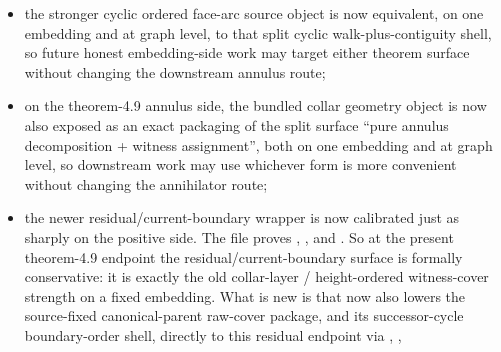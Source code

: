 \documentclass[11pt]{article}
\begin{document}
\begin{itemize}
then upgrades the canonical decomposition
 to a full
annulus witness assignment, and
 packages the honest-source
corollary as
.
So the live one-collar construction burden is now stated on a concrete
facewise object rather than an opaque bundled collar-geometry shell;
\item the stronger cyclic ordered face-arc source object is now equivalent, on
one embedding and at graph level, to that split cyclic walk-plus-contiguity
shell, so future honest embedding-side work may target either theorem surface
without changing the downstream annulus route;
\item on the theorem-4.9 annulus side, the bundled collar geometry object is
now also exposed as an exact packaging of the split surface ``pure annulus
decomposition + witness assignment'', both on one embedding and at graph level,
so downstream work may use whichever form is more convenient without changing
the annihilator route;
\item the newer residual/current-boundary wrapper is now calibrated just as
sharply on the positive side.  The file
 proves
,
,
and
.
So at the present theorem-4.9 endpoint the residual/current-boundary surface is
formally conservative: it is exactly the old collar-layer / height-ordered
witness-cover strength on a fixed embedding.  What is new is that
 now also lowers the source-fixed
canonical-parent raw-cover package, and its successor-cycle boundary-order
shell, directly to this residual endpoint via
,
,

\end{itemize}
\end{document}

